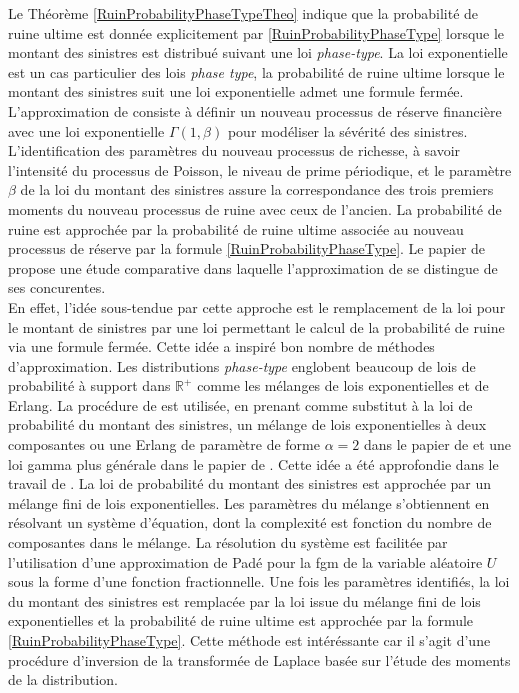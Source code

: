 Le Théorème \ref{RuinProbabilityPhaseTypeTheo} indique que la probabilité de ruine ultime est donnée explicitement par \eqref{RuinProbabilityPhaseType} lorsque le montant des sinistres est distribué suivant une loi \textit{phase-type}. La loi exponentielle est un cas particulier des lois \textit{phase type}, la probabilité de ruine ultime lorsque le montant des sinistres suit une loi exponentielle admet une formule fermée. L'approximation de \citet{DV78} consiste à définir un nouveau processus de réserve financière avec une loi exponentielle $\Gamma(1,\beta)$ pour modéliser la sévérité des sinistres. L'identification des paramètres du nouveau processus de richesse, à savoir l\rq{}intensité du processus de Poisson, le niveau de prime périodique, et le paramètre $\beta$ de la loi du montant des sinistres assure la correspondance des trois premiers moments du nouveau processus de ruine avec ceux de l'ancien. La probabilité de ruine est approchée par la probabilité de ruine ultime associée au nouveau processus de réserve par la formule \eqref{RuinProbabilityPhaseType}. Le papier de \citet{Gr00} propose une étude comparative dans laquelle l\rq{}approximation de \citet{DV78} se distingue de ses concurentes.\\ 

En effet, l'idée sous-tendue par cette approche est le remplacement de la loi pour le montant de sinistres par une loi permettant le calcul de la probabilité de ruine via une formule fermée. Cette idée a inspiré bon nombre de méthodes d'approximation. Les distributions \textit{phase-type} englobent beaucoup de lois de probabilité à support dans $\mathbb{R}^{+}$ comme les mélanges de lois exponentielles et de Erlang. La procédure de \citet{DV78} est utilisée, en prenant comme substitut à la loi de probabilité du montant des sinistres, un mélange de lois exponentielles à deux composantes ou une Erlang de paramètre de forme $\alpha=2$ dans le papier de \citet{Ra92} et une loi gamma plus générale dans le papier de \citet{BuMiWe05}. Cette idée a été approfondie dans le travail de \citet{AvChHo11}. La loi de probabilité du montant des sinistres est approchée par un mélange fini de lois exponentielles. Les paramètres du mélange s'obtiennent en résolvant un système d'équation, dont la complexité est fonction du nombre de composantes dans le mélange. La résolution du système est facilitée par l'utilisation d'une approximation de Padé pour la \gls{fgm} de la variable aléatoire $U$ sous la forme d'une fonction fractionnelle. Une fois les paramètres identifiés, la loi du montant des sinistres est remplacée par la loi issue du mélange fini de lois exponentielles et la probabilité de ruine ultime est approchée par la formule \eqref{RuinProbabilityPhaseType}. Cette méthode est intéréssante car il s'agit d'une procédure d'inversion de la transformée de Laplace basée sur l'étude des moments de la distribution.\\

